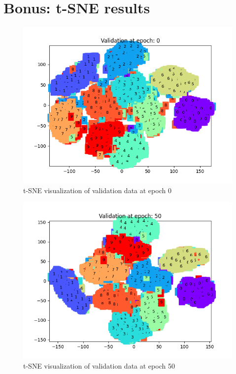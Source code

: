 \documentclass{article}
\begin{document}
\section{Bonus: t-SNE results}
    \begin{figure}
        \includegraphics[scale=0.6]{Validation at epoch: 0.png}
        \centering
        \caption{t-SNE visualization of validation data at epoch 0} \label{fig:4}
    \end{figure}
    \begin{figure}
        \includegraphics[scale=0.6]{Validation at epoch: 50.png}
        \centering
        \caption{t-SNE visualization of validation data at epoch 50} \label{fig:5}
    \end{figure}
\end{document}
